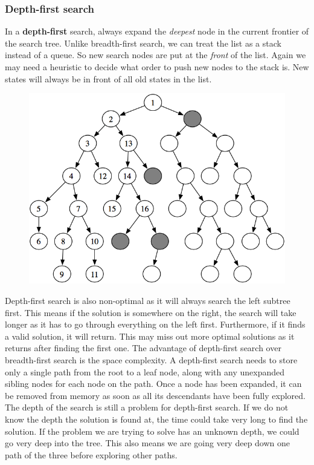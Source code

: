 \documentclass{article}
\newcommand{\n}[0]{\\[\baselineskip]}
\begin{document}
\subsubsection{Depth-first search}
In a \textbf{depth-first} search, always expand the \textit{deepest} node in the current frontier of the search tree. Unlike breadth-first search, we can treat the list as a stack instead of a queue. So new search nodes are put at the \textit{front} of the list. Again we may need a heuristic to decide what order to push new nodes to the stack is. New states will always be in front of all old states in the list.
\begin{figure}[H]
\centering
\includegraphics[width=1\textwidth, keepaspectratio]{imgs/depth-first-search.png}
\end{figure}
\noindent
Depth-first search is also non-optimal as it will always search the left subtree first. This means if the solution is somewhere on the right, the search will take longer as it has to go through everything on the left first. Furthermore, if it finds a valid solution, it will return. This may miss out more optimal solutions as it returns after finding the first one. The advantage of depth-first search over breadth-first search is the space complexity. A depth-first search needs to store only a single path from the root to a leaf node, along with any unexpanded sibling nodes for each node on the path. Once a node has been expanded, it can be removed from memory as soon as all its descendants have been fully explored.
\n
The depth of the search is still a problem for depth-first search. If we do not know the depth the solution is found at, the time could take very long to find the solution. If the problem we are trying to solve has an unknown depth, we could go very deep into the tree. This also means we are going very deep down one path of the three before exploring other paths.
\end{document}
